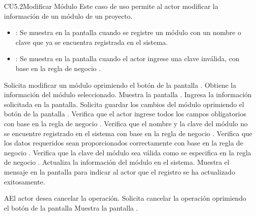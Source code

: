 \begin{UseCase}{CU5.2}{Modificar Módulo}{
		Este caso de uso permite al actor modificar la información de un módulo de un proyecto.
	}
{\begin{itemize}
		\item {}: Se muestra en la pantalla  cuando se registre un módulo con un nombre o clave que ya se encuentra registrada en el sistema.
		\item {}: Se muestra en la pantalla  cuando el actor ingrese una clave inválida, con base en la regla de negocio .
		\end{itemize}
		}
	\end{UseCase}
	\begin{UCtrayectoria}
		\UCpaso[\UCactor] Solicita modificar un módulo oprimiendo el botón \editar de la pantalla .
		\UCpaso[\UCsist] Obtiene la información del módulo seleccionado.
		\UCpaso[\UCsist] Muestra la pantalla .
		\UCpaso[\UCactor] Ingresa la información solicitada en la pantalla. \label{CU5.2-P4}
		\UCpaso[\UCactor] Solicita guardar los cambios del módulo oprimiendo el botón  de la pantalla . 
		\UCpaso[\UCsist] Verifica que el actor ingrese todos los campos obligatorios con base en la regla de negocio . 
		\UCpaso[\UCsist] Verifica que el nombre y la clave del módulo no se encuentre registrado en el sistema con base en la regla de negocio . 
		\UCpaso[\UCsist] Verifica que los datos requeridos sean proporcionados correctamente con base en la regla de negocio .  
		\UCpaso[\UCsist] Verifica que la clave del módulo sea válida como se especifica en la regla de negocio . 
		\UCpaso[\UCsist] Actualiza la información del módulo en el sistema.
		\UCpaso[\UCsist] Muestra el mensaje  en la pantalla  para indicar al actor que el registro se ha actualizado exitosamente.
	\end{UCtrayectoria}		
	
	\begin{UCtrayectoriaA}{A}{El actor desea cancelar la operación.}
		\UCpaso[\UCactor] Solicita cancelar la operación oprimiendo el botón  de la pantalla 
		\UCpaso[\UCsist] Muestra la pantalla .
	\end{UCtrayectoriaA}


